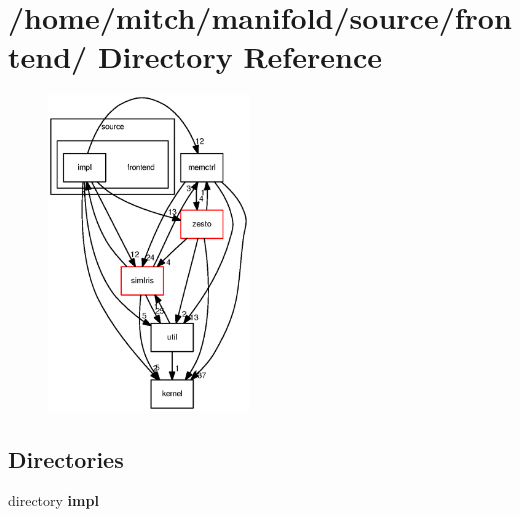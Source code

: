 \section{/home/mitch/manifold/source/frontend/ Directory Reference}
\label{dir_59f665c8d1b39b679fdca682086ca1fa}


\nopagebreak
\begin{figure}[H]
\begin{center}
\leavevmode
\includegraphics[width=151pt]{dir_59f665c8d1b39b679fdca682086ca1fa_dep}
\end{center}
\end{figure}
\subsection*{Directories}
\begin{CompactItemize}
\item 
directory {\bf impl}
\end{CompactItemize}
